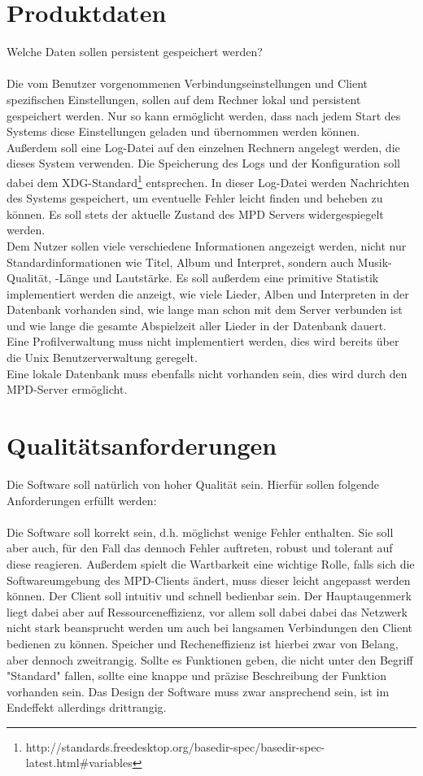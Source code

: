 \section{Produktdaten}
Welche Daten sollen persistent gespeichert werden?\ \\ \\
Die vom Benutzer vorgenommenen Verbindungseinstellungen und Client spezifischen Einstellungen,
sollen auf dem Rechner lokal und persistent gespeichert werden. Nur so kann ermöglicht werden,
dass nach jedem Start des Systems diese Einstellungen geladen und übernommen werden können.\ \\
Außerdem soll eine Log-Datei auf den einzelnen Rechnern angelegt werden, die dieses System
verwenden. Die Speicherung des Logs und der Konfiguration soll dabei dem XDG-Standard\footnote{http://standards.freedesktop.org/basedir-spec/basedir-spec-latest.html\#variables} entsprechen. 
In dieser Log-Datei werden Nachrichten des Systems gespeichert, um eventuelle Fehler
leicht finden und beheben zu können. Es soll stets der aktuelle Zustand des MPD Servers widergespiegelt werden.
\\
Dem Nutzer sollen viele verschiedene Informationen angezeigt werden, nicht nur Standardinformationen
wie Titel, Album und Interpret, sondern auch Musik-Qualität, -Länge und Lautstärke.
Es soll außerdem eine primitive Statistik implementiert werden die anzeigt, wie viele Lieder, Alben und
Interpreten in der Datenbank vorhanden sind, wie lange man schon mit dem Server verbunden ist und wie 
lange die gesamte Abspielzeit aller Lieder in der Datenbank dauert.\ \\
Eine Profilverwaltung muss nicht implementiert werden, dies wird bereits über die Unix Benutzerverwaltung geregelt.\ \\
Eine lokale Datenbank muss ebenfalls nicht vorhanden sein, dies wird durch den MPD-Server ermöglicht.\ \\

\section{Qualitätsanforderungen}
Die Software soll natürlich von hoher Qualität sein. Hierfür sollen folgende
Anforderungen erfüllt werden:\ 
\\
\\
Die Software soll korrekt sein, d.h. möglichst wenige Fehler enthalten.
Sie soll aber auch, für den Fall das dennoch Fehler auftreten, robust
und tolerant auf diese reagieren. Außerdem spielt die Wartbarkeit 
eine wichtige Rolle, falls sich die Softwareumgebung des MPD-Clients
ändert, muss dieser leicht angepasst werden können.
Der Client soll intuitiv und schnell bedienbar sein.
Der Hauptaugenmerk liegt dabei aber auf Ressourceneffizienz, vor allem soll dabei dabei 
das Netzwerk nicht stark beansprucht werden um auch bei langsamen Verbindungen den Client
bedienen zu können. Speicher und Recheneffizienz ist hierbei zwar von Belang, aber dennoch zweitrangig. 
Sollte es Funktionen geben, die nicht unter den Begriff "Standard" fallen, sollte eine knappe
und präzise Beschreibung der Funktion vorhanden sein.
Das Design der Software muss zwar ansprechend sein, ist im Endeffekt allerdings drittrangig.

